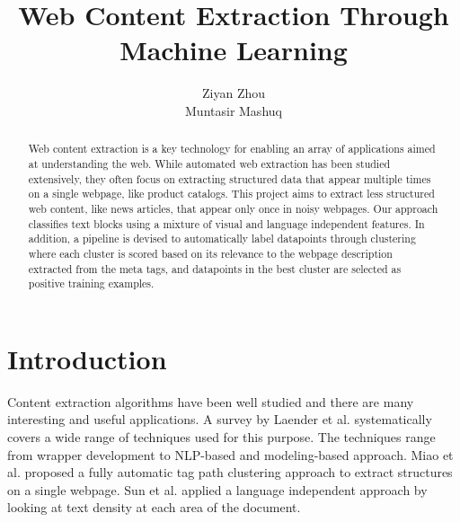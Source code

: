 \documentclass{acm_proc_article-sp}
\begin{document}
\title{Web Content Extraction Through Machine Learning
}

\author{
\alignauthor
Ziyan Zhou\\
\alignauthor
Muntasir Mashuq\\
}

\maketitle

\begin{abstract}
Web content extraction is a key technology for enabling an array of applications aimed at understanding the web. While automated web extraction has been studied extensively, they often focus on extracting structured data that appear multiple times on a single webpage, like product catalogs. This project aims to extract less structured web content, like news articles, that appear only once in noisy webpages. Our approach classifies text blocks using a mixture of visual and language independent features. In addition, a pipeline is devised to automatically label datapoints through clustering where each cluster is scored based on its relevance to the webpage description extracted from the meta tags, and datapoints in the best cluster are selected as positive training examples.
\end{abstract}


\section{Introduction}

Content extraction algorithms have been well studied and there are many interesting and useful applications\cite{diffbot}\cite{readability}. A survey by Laender et al.\cite{laender:brief} systematically covers a wide range of techniques used for this purpose. The techniques range from wrapper development to NLP-based and modeling-based approach. Miao et al.\cite{gengxin:extracting} proposed a fully automatic tag path clustering approach to extract structures on a single webpage. Sun et al.\cite{sun2011dom} applied a language independent approach by looking at text density at each area of the document.
\end{document}

